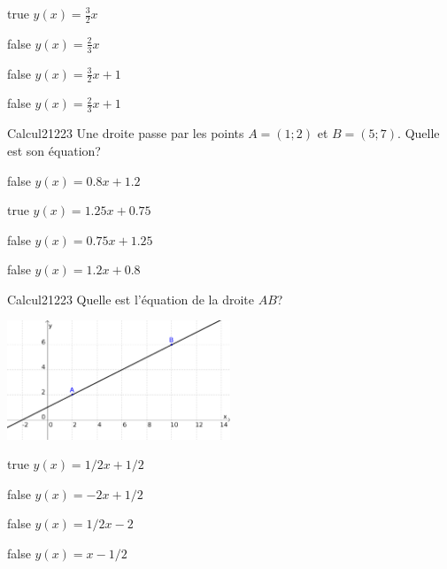 \documentclass[11pt]{article}
\begin{document}
            \begin{reponses}
            	\item[true] $y(x)=\frac{3}{2}x$
            	\item[false] $y(x)=\frac{2}{3}x$
                \item[false] $y(x)=\frac{3}{2}x+1$
                \item[false] $y(x)=\frac{2}{3}x+1$
            \end{reponses}

            \begin{question}{27}{Calcul}{2}{1223}
                Une droite passe par les points $A = (1;2)$ et $B = (5;7)$. Quelle est son équation?
            \end{question}

            \begin{reponses}
                \item[false] $y(x)=\num{0.8}x+\num{1.2}$
                \item[true] $y(x)=\num{1.25}x+\num{0.75}$
                \item[false] $y(x)=\num{0.75}x+\num{1.25}$
                \item[false] $y(x)=\num{1.2}x+\num{0.8}$
            \end{reponses}

            \begin{question}{27}{Calcul}{2}{1223}
                Quelle est l'équation de la droite $AB$?\\
                \begin{center}
                	\includegraphics[width=0.5\textwidth]{Philippe/Figures_Philippe/calcul_6_9.png}
                \end{center}
            \end{question}

            \begin{reponses}
                \item[true] $y(x)=1/2x+1/2$
                \item[false] $y(x)=-2x+1/2$
                \item[false] $y(x)=1/2x-2$
                \item[false] $y(x)=x-1/2$
            \end{reponses}
\end{document}
